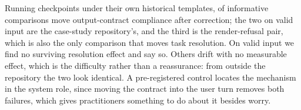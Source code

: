 Running \NCheckpoints{} checkpoints under their own historical templates, \NSigContract{} of
\NFamily{} informative comparisons move output-contract compliance after correction; the two on
valid input are the case-study repository's, and the third is the render-refusal pair, which is
also the only comparison that moves task resolution. On valid input we find no surviving resolution effect and say so. Others drift with no
measurable effect, which is the difficulty rather than a reassurance: from outside the repository the
two look identical. A pre-registered control locates the mechanism in the system role, since moving
the contract into the user turn removes both failures, which gives practitioners something to do
about it besides worry.
